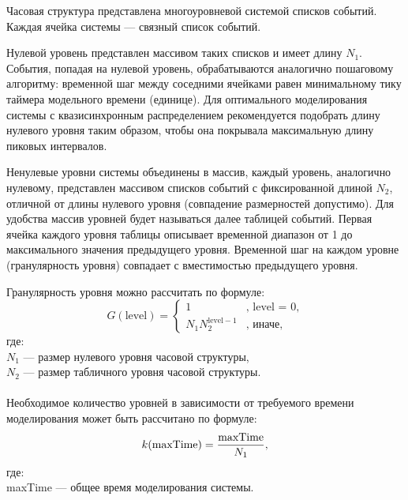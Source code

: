 Часовая структура представлена многоуровневой системой списков событий. Каждая ячейка системы --- связный список событий. 

Нулевой уровень представлен массивом таких списков и имеет длину $N_1$. События, попадая на нулевой уровень, обрабатываются аналогично пошаговому алгоритму: временной шаг между соседними ячейками равен минимальному тику таймера модельного времени (единице). Для оптимального моделирования системы с квазисинхронным распределением рекомендуется подобрать длину нулевого уровня таким образом, чтобы она покрывала максимальную длину пиковых интервалов.

Ненулевые уровни системы объединены в массив, каждый уровень, аналогично нулевому, представлен массивом списков событий с фиксированной длиной $N_2$, отличной от длины нулевого уровня (совпадение размерностей допустимо). Для удобства массив уровней будет называться далее таблицей событий. Первая ячейка каждого уровня таблицы описывает временной диапазон от 1 до максимального значения предыдущего уровня. Временной шаг на каждом уровне (гранулярность уровня) совпадает с вместимостью предыдущего уровня.

Гранулярность уровня можно рассчитать по формуле:
\begin{equation}
	G(\text{level}) = 
	\begin{cases}
		1 & \text{, level = 0,} \\
		N_1 N_2^{\text{level}-1} & \text{, иначе,}
	\end{cases}
\end{equation}
где: \\
$N_1$ --- размер нулевого уровня часовой структуры, \\
$N_2$ --- размер табличного уровня часовой структуры. \\ \\



Необходимое количество уровней в зависимости от требуемого времени моделирования может быть рассчитано по формуле:
\begin{equation}
	k(\text{maxTime}) = \frac{\text{maxTime}} {N_1} \text{,}	\\
\end{equation}
где: \\
maxTime --- общее время моделирования системы. \\ \\

